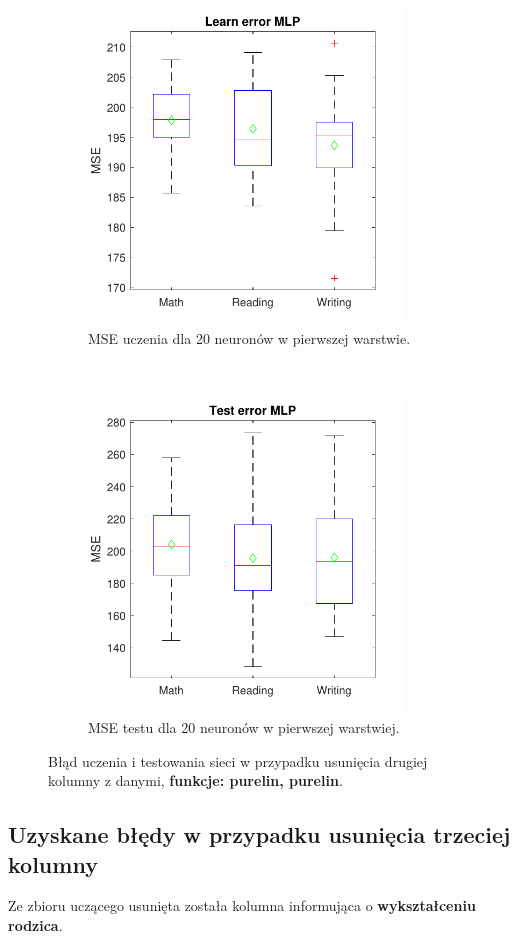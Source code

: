 \documentclass[12pt]{article}
\begin{document}
\begin{figure}[H]
\centering
\begin{subfigure}[t]{0.48\textwidth} 
\centering
\includegraphics[height=3.3in]{purelin_purelin_20_without_2_learnBoxplot.pdf}
\caption{MSE uczenia dla  20 neuronów w pierwszej warstwie.}
\end{subfigure}
~~
\begin{subfigure}[t]{0.48\textwidth} 
\centering
\includegraphics[height=3.3in]{purelin_purelin_20_without_2_testBoxplot.pdf}
\caption{MSE testu dla  20  neuronów w pierwszej warstwiej.}
\end{subfigure}

\caption{Błąd uczenia i testowania sieci w przypadku usunięcia drugiej kolumny z danymi, \textbf{funkcje: purelin, purelin}.}
\end{figure}

\pagebreak
\subsection{Uzyskane błędy w przypadku usunięcia trzeciej kolumny}
Ze zbioru uczącego usunięta została kolumna informująca o \textbf{wykształceniu rodzica}.
\end{document}
